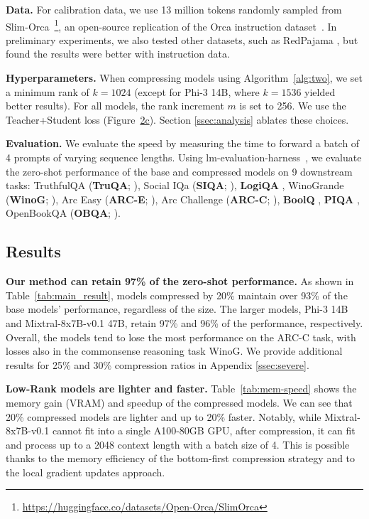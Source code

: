 \documentclass[11pt]{article}
\newcommand{\myparagraph}[1]{\noindent\textbf{#1}}
\begin{document}
\myparagraph{Data.} For calibration data, we use 13 million tokens randomly
sampled from
Slim-Orca~\citep{SlimOrca}\footnote{{\scriptsize{\url{https://huggingface.co/datasets/Open-Orca/SlimOrca}}}},
an open-source replication of the Orca instruction
dataset~\citep{mukherjee2023orca}. In preliminary experiments, we also tested
other datasets, such as RedPajama \citep{together2023redpajama}, but found the results were better with instruction data.

\myparagraph{Hyperparameters.}
When compressing models using Algorithm~\ref{alg:two}, we set a minimum rank of $k=1024$ (except for Phi-3 14B, where $k=1536$ yielded better results). For all models, the rank increment $m$ is set to 256. We use the Teacher+Student loss (Figure~\hyperref[fig:teacher_student]{2c}). Section \ref{ssec:analysis} ablates these choices.

\myparagraph{Evaluation.} 
We evaluate the speed by measuring the time to forward a batch of 4 prompts of varying sequence lengths. Using lm-evaluation-harness~\citep{eval-harness}, we evaluate the zero-shot performance of the base and compressed models on 9 downstream tasks: TruthfulQA (\textbf{TruQA};
\citep{lin-etal-2022-truthfulqa}), Social IQa (\textbf{SIQA};
\citep{sap2019social}), \textbf{LogiQA} \citep{liu2020logiqa}, WinoGrande
(\textbf{WinoG}; \citep{sakaguchi2019winogrande}), Arc Easy (\textbf{ARC-E};
\citep{arc}), Arc Challenge (\textbf{ARC-C}; \citep{arc}), \textbf{BoolQ}
\citep{boolq}, \textbf{PIQA} \citep{piqa}, OpenBookQA (\textbf{OBQA};
\citep{obqa}).

\subsection{Results}

\myparagraph{Our method can retain 97\% of the zero-shot performance.} As shown in Table~\ref{tab:main_result}, models compressed by 20\% maintain over 93\% of the base models' performance, regardless of the size. The larger models, Phi-3 14B and Mixtral-8x7B-v0.1 47B, retain 97\% and 96\% of the performance, respectively. Overall, the models tend to lose the most performance on the ARC-C task, with losses also in the commonsense reasoning task WinoG. We provide additional results for 25\% and 30\% compression ratios in Appendix \ref{ssec:severe}.

\myparagraph{Low-Rank models are lighter and faster.}
Table~\ref{tab:mem-speed} shows the memory gain (VRAM) and speedup of the
compressed models. We can see that 20\% compressed models are lighter and up to
20\% faster. Notably, while Mixtral-8x7B-v0.1 cannot fit into a single A100-80GB
GPU, after compression, it can fit and process up to a 2048
context length with a batch size of 4. This is possible thanks to the memory
efficiency of the bottom-first compression strategy and to the local gradient
updates approach.
\end{document}
